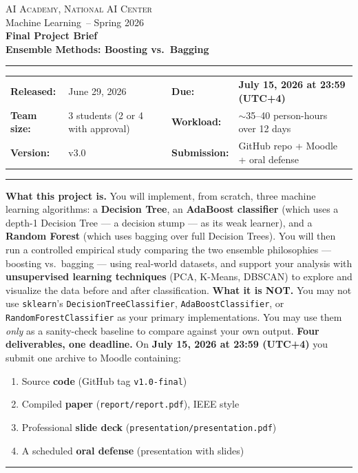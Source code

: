 \documentclass[11pt,a4paper]{article}
\newcommand{\coursename}{Machine Learning}
\newcommand{\institution}{AI Academy, National AI Center}
\newcommand{\semester}{Spring 2026}
\newcommand{\projecttitle}{Ensemble Methods: Boosting vs.\ Bagging}
\newcommand{\releasedate}{June 29, 2026}
\newcommand{\duedate}{July 15, 2026 at 23:59 (UTC+4)}
\newcommand{\version}{v3.0}
\begin{document}
\begin{center}
{\small \textsc{\institution} \\[0.2em] { \coursename\ -- \semester}}\\[1.2em]
{\Large\bfseries\color{accent} Final Project Brief}\\[0.3em]
{\LARGE\bfseries \projecttitle}\\[1em]
\rule{0.85\textwidth}{0.6pt}
\end{center}
\begin{tabularx}{\textwidth}{@{}lXlX@{}}
\textbf{Released:} & \releasedate & \textbf{Due:} & \textcolor{accent2}{\textbf{\duedate}} \\
\textbf{Team size:} & 3 students (2 or 4 with approval) & \textbf{Workload:} & $\sim$35--40 person-hours over 12 days \\
\textbf{Version:} & \version & \textbf{Submission:} & GitHub repo + Moodle + oral defense \\
\end{tabularx}
\vspace{0.4em}\hrule\vspace{0.6em}
\begin{infobox}[At a glance]
\textbf{What this project is.} You will implement, from scratch, three machine learning algorithms: a \textbf{Decision Tree}, an \textbf{AdaBoost classifier} (which uses a depth-1 Decision Tree --- a decision stump --- as its weak learner), and a \textbf{Random Forest} (which uses bagging over full Decision Trees). You will then run a controlled empirical study comparing the two ensemble philosophies --- boosting vs.\ bagging --- using real-world datasets, and support your analysis with \textbf{unsupervised learning techniques} (PCA, K-Means, DBSCAN) to explore and visualize the data before and after classification.
\smallskip
\textbf{What it is NOT.} You may not use \texttt{sklearn}'s \texttt{DecisionTreeClassifier}, \texttt{AdaBoostClassifier}, or \texttt{RandomForestClassifier} as your primary implementations. You may use them \emph{only} as a sanity-check baseline to compare against your own output.
\smallskip
\textbf{Four deliverables, one deadline.} On \textcolor{accent2}{\textbf{\duedate}} you submit one archive to Moodle containing:
\begin{enumerate}[topsep=2pt,itemsep=1pt,leftmargin=2.2em]
  \item Source \textbf{code} (GitHub tag \texttt{v1.0-final})
  \item Compiled \textbf{paper} (\texttt{report/report.pdf}), IEEE style
  \item Professional \textbf{slide deck} (\texttt{presentation/presentation.pdf})
  \item A scheduled \textbf{oral defense} (presentation with slides)
\end{enumerate}
\end{infobox}
\tableofcontents
\vspace{0.6em}\hrule\vspace{0.4em}
\end{document}
